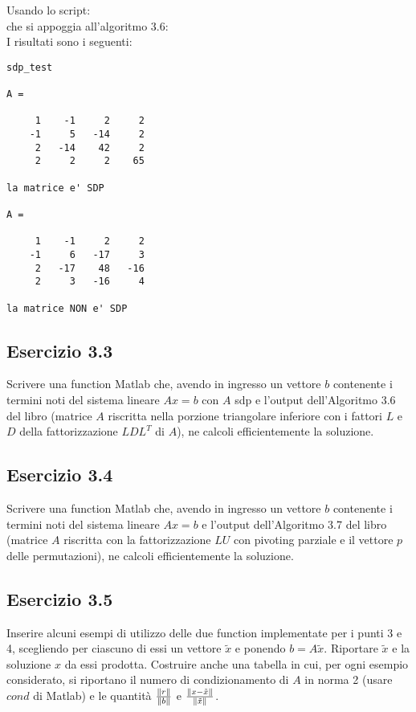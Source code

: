 Usando lo script: \\

che si appoggia all'algoritmo 3.6:\\

I risultati sono i seguenti:\\
\begin{lstlisting}[frame=single]
sdp_test

A =

     1    -1     2     2
    -1     5   -14     2
     2   -14    42     2
     2     2     2    65

la matrice e' SDP

A =

     1    -1     2     2
    -1     6   -17     3
     2   -17    48   -16
     2     3   -16     4

la matrice NON e' SDP
\end{lstlisting}


	\subsection{Esercizio 3.3}

Scrivere una function Matlab che, avendo in ingresso un vettore $b$ contenente i termini noti del sistema lineare $Ax = b$ con $A$ sdp e l’output dell’Algoritmo 3.6 del libro (matrice $A$ riscritta nella porzione triangolare inferiore con i fattori $L$ e $D$ della fattorizzazione $LDL^{T}$ di $A$), ne calcoli efficientemente la soluzione.

\TODO
	

	\subsection{Esercizio 3.4}

Scrivere una function Matlab che, avendo in ingresso un vettore $b$ contenente i termini noti del sistema lineare $Ax = b$ e l’output dell’Algoritmo 3.7 del libro (matrice $A$ riscritta con la fattorizzazione $LU$ con pivoting parziale e il vettore $p$ delle permutazioni), ne calcoli efficientemente la soluzione.

\TODO


	\subsection{Esercizio 3.5}

 Inserire alcuni esempi di utilizzo delle due function implementate per i punti 3 e 4, scegliendo per ciascuno di essi un vettore $\tilde{x}$ e ponendo $b = A\tilde{x}$. Riportare $\tilde{x}$ e la soluzione $x$ da essi prodotta. Costruire anche una tabella in cui, per ogni esempio considerato, si riportano il numero di condizionamento di $A$ in norma 2 (usare $cond$ di Matlab) e le quantità $\frac{\norm{r}}{\norm{b}}$ e $\frac{\norm{x-\tilde{x}}}{\norm{\tilde{x}}}$.

